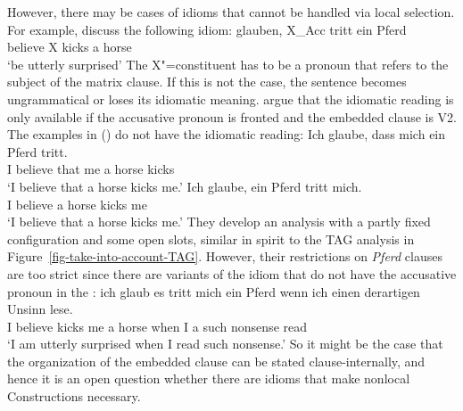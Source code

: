 \documentclass[output=paper
	        ,collection
	        ,collectionchapter
 	        ,biblatex
                ,babelshorthands
                ,newtxmath
                ,draftmode
                ,colorlinks, citecolor=brown
]{langscibook}
\begin{document}
However, there may be cases of idioms that cannot be handled via local selection.
For example, \citet{RS2009a} discuss the following idiom:
\ea
\label{mich-tritt-ein-Pferd}
\gll glauben, X\_Acc tritt ein Pferd\\
     believe  X     kicks a horse\\
\glt `be utterly surprised'
\z
The X"=constituent has to be a pronoun that refers to the subject of the matrix clause. If this is not the case, the sentence becomes ungrammatical or loses its idiomatic meaning.
\eal
{}
\zl
\citet[]{RS2009a} argue that the idiomatic reading
is only available if the accusative pronoun is fronted and the embedded clause is V2. The examples
in () do not have the idiomatic reading:
\eal
\ex 
\gll Ich glaube, dass mich ein Pferd tritt.\\
     I believe   that me   a horse   kicks\\
\glt `I believe that a horse kicks me.'
\ex 
\gll Ich glaube, ein Pferd tritt mich.\\
     I believe   a horse   kicks me\\
\glt `I believe that a horse kicks me.'
\zl
They develop an analysis with a partly fixed configuration and some open slots, similar in spirit to
the TAG analysis in Figure~\ref{fig-take-into-account-TAG}. However, their restrictions on \emph{Pferd} clauses are too strict since there are
variants of the idiom that do not have the accusative pronoun in the \vf:
\ea 
\gll ich glaub es tritt mich ein Pferd wenn ich einen derartigen Unsinn lese.\footnotemark\\
     I believe \expl{} kicks me a horse when I a such nonsense read\\
\glt `I am utterly surprised when I read such nonsense.'
\z
So it might be the case that the organization of the embedded clause can be stated clause-internally,
and hence it is an open question whether there are idioms that make nonlocal Constructions necessary.
\end{document}
